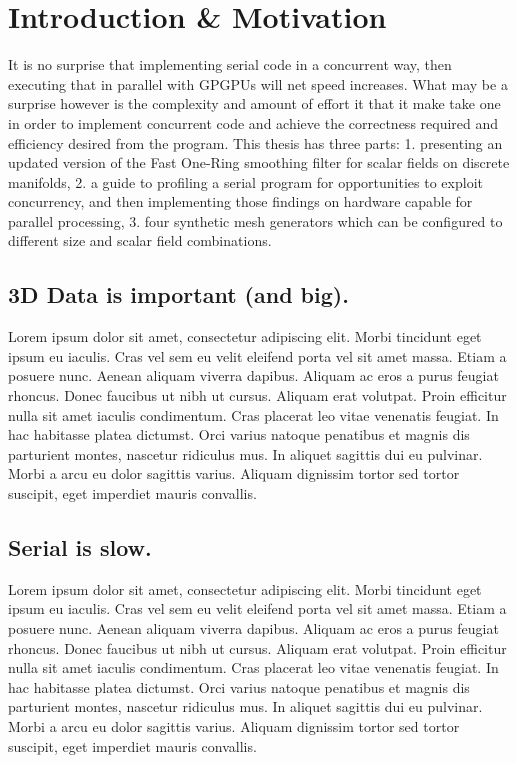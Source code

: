 \chapter{Introduction \& Motivation}
It is no surprise that implementing serial code in a concurrent way, then executing that in parallel with GPGPUs will net speed increases. What may be a surprise however is the complexity and amount of effort it that it make take one in order to implement concurrent code and achieve the correctness required and  efficiency desired from the program. This thesis has three parts: 1. presenting an updated version of the Fast One-Ring smoothing filter for scalar fields on discrete manifolds, 2. a guide to profiling a serial program for opportunities to exploit concurrency, and then implementing those findings on hardware capable for parallel processing, 3. four synthetic mesh generators which can be configured to different size and scalar field combinations.

\section{3D Data is important (and big).} 
Lorem ipsum dolor sit amet, consectetur adipiscing elit. Morbi tincidunt eget 
ipsum eu iaculis. Cras vel sem eu velit eleifend porta vel sit amet massa. Etiam 
a posuere nunc. Aenean aliquam viverra dapibus. Aliquam ac eros a purus feugiat 
rhoncus. Donec faucibus ut nibh ut cursus. Aliquam erat volutpat. Proin efficitur 
nulla sit amet iaculis condimentum. Cras placerat leo vitae venenatis feugiat. In 
hac habitasse platea dictumst. Orci varius natoque penatibus et magnis dis 
parturient montes, nascetur ridiculus mus. In aliquet sagittis dui eu pulvinar. 
Morbi a arcu eu dolor sagittis varius. Aliquam dignissim tortor sed tortor 
suscipit, eget imperdiet mauris convallis.~\cite[p.~00]{todoCitation}\todoCitation


\section{Serial is slow.}
Lorem ipsum dolor sit amet, consectetur adipiscing elit. Morbi tincidunt eget 
ipsum eu iaculis. Cras vel sem eu velit eleifend porta vel sit amet massa. Etiam 
a posuere nunc. Aenean aliquam viverra dapibus. Aliquam ac eros a purus feugiat 
rhoncus. Donec faucibus ut nibh ut cursus. Aliquam erat volutpat. Proin efficitur 
nulla sit amet iaculis condimentum. Cras placerat leo vitae venenatis feugiat. In 
hac habitasse platea dictumst. Orci varius natoque penatibus et magnis dis 
parturient montes, nascetur ridiculus mus. In aliquet sagittis dui eu pulvinar. 
Morbi a arcu eu dolor sagittis varius. Aliquam dignissim tortor sed tortor 
suscipit, eget imperdiet mauris convallis.~\cite[p.~00]{todoCitation}\todoCitation



